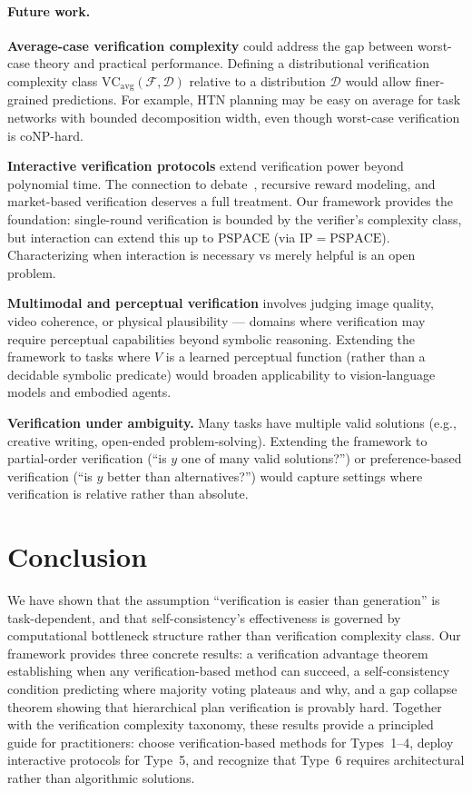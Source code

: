 \documentclass{article}
\theoremstyle{definition}
\theoremstyle{remark}
\newcommand{\coNP}{\mathrm{coNP}}
\newcommand{\PSPACE}{\mathrm{PSPACE}}
\newcommand{\IP}{\mathrm{IP}}
\newcommand{\VC}{\mathrm{VC}}           %
\newcommand{\calF}{\mathcal{F}}         %
\newcommand{\calD}{\mathcal{D}}         %
\begin{document}
\paragraph{Future work.}
\textbf{Average-case verification complexity} could address the gap between worst-case theory and practical performance. Defining a distributional verification complexity class $\VC_{\text{avg}}(\calF, \calD)$ relative to a distribution $\calD$ would allow finer-grained predictions. For example, HTN planning may be easy on average for task networks with bounded decomposition width, even though worst-case verification is $\coNP$-hard.

\textbf{Interactive verification protocols} extend verification power beyond polynomial time. The connection to debate~\citep{irving2018debate,browncohen2024debate}, recursive reward modeling, and market-based verification deserves a full treatment. Our framework provides the foundation: single-round verification is bounded by the verifier's complexity class, but interaction can extend this up to $\PSPACE$ (via $\IP = \PSPACE$). Characterizing when interaction is necessary vs merely helpful is an open problem.

\textbf{Multimodal and perceptual verification} involves judging image quality, video coherence, or physical plausibility --- domains where verification may require perceptual capabilities beyond symbolic reasoning. Extending the framework to tasks where $V$ is a learned perceptual function (rather than a decidable symbolic predicate) would broaden applicability to vision-language models and embodied agents.

\textbf{Verification under ambiguity.} Many tasks have multiple valid solutions (e.g., creative writing, open-ended problem-solving). Extending the framework to partial-order verification (``is $y$ one of many valid solutions?'') or preference-based verification (``is $y$ better than alternatives?'') would capture settings where verification is relative rather than absolute.

\section{Conclusion}
\label{sec:conclusion}

We have shown that the assumption ``verification is easier than generation'' is task-dependent, and that self-consistency's effectiveness is governed by computational bottleneck structure rather than verification complexity class.
Our framework provides three concrete results: a verification advantage theorem establishing when any verification-based method can succeed, a self-consistency condition predicting where majority voting plateaus and why, and a gap collapse theorem showing that hierarchical plan verification is provably hard.
Together with the verification complexity taxonomy, these results provide a principled guide for practitioners: choose verification-based methods for Types~1--4, deploy interactive protocols for Type~5, and recognize that Type~6 requires architectural rather than algorithmic solutions.
\end{document}
